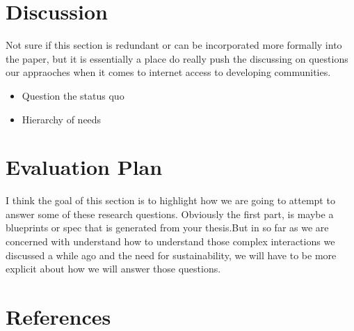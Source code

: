 \documentclass{article}
\begin{document}
\section{Discussion}
Not sure if this section is redundant or can be incorporated more formally into the paper, but it is essentially a place do really push the discussing on questions our appraoches when it comes to internet access to developing communities.
\begin{itemize}
 \item Question the status quo
 \item Hierarchy of needs
\end{itemize}
\section{Evaluation Plan}
I think the goal of this section is to highlight how we are going to attempt to answer some of these research questions. Obviously the first part, is maybe a blueprints or spec that is generated from your thesis.But in so far as we are concerned with understand how to understand those complex interactions we discussed a while ago and the need for sustainability, we will have to be more explicit about how we will answer those questions. 
\section{References}
\end{document}
